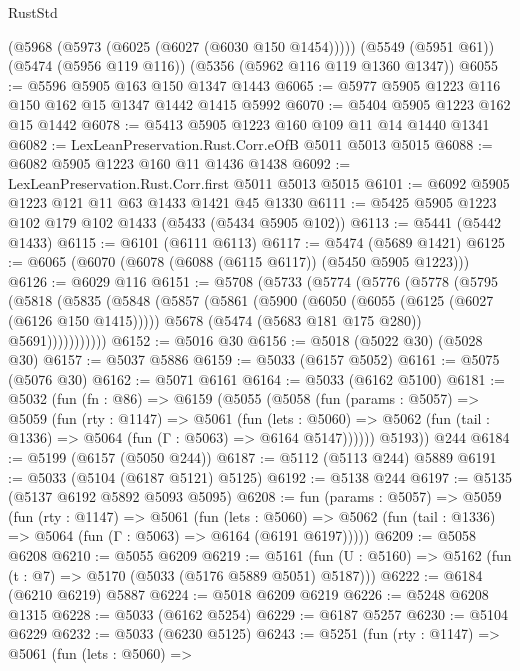 \begin{lexlean}{RustStd}
\begin{coremodule}
    (@5968 (@5973 (@6025 (@6027 (@6030 @150 @1454)))))
    (@5549 (@5951 @61))
    (@5474 (@5956 @119 @116))
    (@5356 (@5962 @116 @119 @1360 @1347))
@6055 := @5596 @5905 @163 @150 @1347 @1443
@6065 := @5977 @5905 @1223 @116 @150 @162 @15 @1347 @1442 @1415 @5992
@6070 := @5404 @5905 @1223 @162 @15 @1442
@6078 := @5413 @5905 @1223 @160 @109 @11 @14 @1440 @1341
@6082 := LexLeanPreservation.Rust.Corr.eOfB @5011 @5013 @5015
@6088 := @6082 @5905 @1223 @160 @11 @1436 @1438
@6092 := LexLeanPreservation.Rust.Corr.first @5011 @5013 @5015
@6101 := @6092 @5905 @1223 @121 @11 @63 @1433 @1421 @45 @1330
@6111 := @5425 @5905 @1223 @102 @179 @102 @1433 (@5433 (@5434 @5905 @102))
@6113 := @5441 (@5442 @1433)
@6115 := @6101 (@6111 @6113)
@6117 := @5474 (@5689 @1421)
@6125 := @6065 (@6070 (@6078 (@6088 (@6115 @6117)) (@5450 @5905 @1223)))
@6126 := @6029 @116
@6151 := @5708
    (@5733
      (@5774
        (@5776
          (@5778
            (@5795
              (@5818
                (@5835
                  (@5848
                    (@5857
                      (@5861
                        (@5900
                          (@6050 (@6055 (@6125 (@6027 (@6126 @150 @1415)))))
                          @5678
                          (@5474 (@5683 @181 @175 @280))
                          @5691)))))))))))
@6152 := @5016 @30
@6156 := @5018 (@5022 @30) (@5028 @30)
@6157 := @5037 @5886
@6159 := @5033 (@6157 @5052)
@6161 := @5075 (@5076 @30)
@6162 := @5071 @6161
@6164 := @5033 (@6162 @5100)
@6181 := @5032
    (fun (fn : @86) =>
    @6159
      (@5055
        (@5058
          (fun (params : @5057) =>
          @5059
            (fun (rty : @1147) =>
            @5061
              (fun (lets : @5060) =>
              @5062 (fun (tail : @1336) => @5064 (fun (Γ : @5063) => @6164 @5147))))))
        @5193))
    @244
@6184 := @5199 (@6157 (@5050 @244))
@6187 := @5112 (@5113 @244) @5889
@6191 := @5033 (@5104 (@6187 @5121) @5125)
@6192 := @5138 @244
@6197 := @5135 (@5137 @6192 @5892 @5093 @5095)
@6208 := fun (params : @5057) =>
  @5059
    (fun (rty : @1147) =>
    @5061
      (fun (lets : @5060) =>
      @5062 (fun (tail : @1336) => @5064 (fun (Γ : @5063) => @6164 (@6191 @6197)))))
@6209 := @5058 @6208
@6210 := @5055 @6209
@6219 := @5161 (fun (U : @5160) => @5162 (fun (t : @7) => @5170 (@5033 (@5176 @5889 @5051) @5187)))
@6222 := @6184 (@6210 @6219) @5887
@6224 := @5018 @6209 @6219
@6226 := @5248 @6208 @1315
@6228 := @5033 (@6162 @5254)
@6229 := @6187 @5257
@6230 := @5104 @6229
@6232 := @5033 (@6230 @5125)
@6243 := @5251
    (fun (rty : @1147) =>
    @5061
      (fun (lets : @5060) =>

\end{coremodule}
\end{lexlean}
